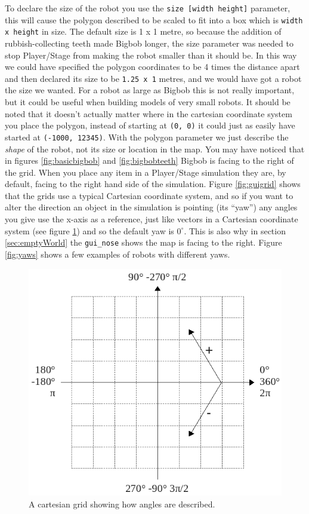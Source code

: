 \documentclass[a4paper]{article}
\newcommand{\plst}{Player/Stage\xspace}
\begin{document}
To declare the size of the robot you use the \verb|size [width height]| parameter, this will cause the polygon described to be scaled to fit into a box which is \verb|width x height| in size. The default size is 1 x 1 metre, so because the addition of rubbish-collecting teeth made Bigbob longer, the size parameter was needed to stop \plst from making the robot smaller than it should be. In this way we could have specified the polygon coordinates to be 4 times the distance apart and then declared its size to be \verb|1.25 x 1| metres, and we would have got a robot the size we wanted. For a robot as large as Bigbob this is not really important, but it could be useful when building models of very small robots. 
It should be noted that it doesn't actually matter where in the cartesian coordinate system you place the polygon, instead of starting at \verb|(0, 0)| it could just as easily have started at \verb|(-1000, 12345)|. With the polygon parameter we just describe the \emph{shape} of the robot, not its size or location in the map. \newline
You may have noticed that in figures \ref{fig:basicbigbob} and \ref{fig:bigbobteeth} Bigbob is facing to the right of the grid. When you place any item in a \plst simulation they are, by default, facing to the right hand side of the simulation. Figure \ref{fig:guigrid} shows that the grids use a typical Cartesian coordinate system, and so if you want to alter the direction an object in the simulation is pointing (its ``yaw'') any angles you give use the x-axis as a reference, just like vectors in a Cartesian coordinate system (see figure \ref{fig:emptycartgrid}) and so the default yaw is $0^{\circ}$. This is also why in section \ref{sec:emptyWorld} the \verb|gui_nose| shows the map is facing to the right. Figure \ref{fig:yaws} shows a few examples of robots with different yaws.

\begin{figure}
	\centering
	\includegraphics[width=0.5\linewidth]{./pics/robot_building/cartesian_grid_wpolars.png} 
	\caption{A cartesian grid showing how angles are described.}
	\label{fig:emptycartgrid}
\end{figure}
\end{document}
